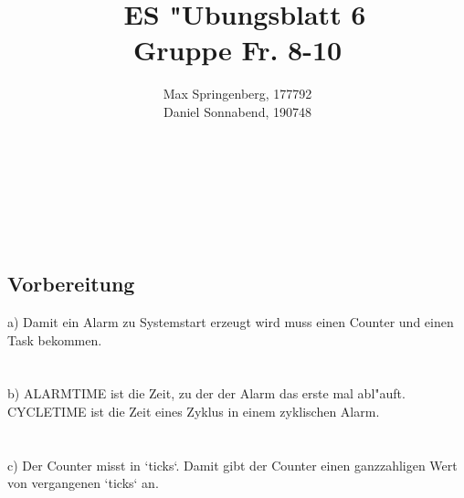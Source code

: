 \documentclass{article}
\author{Max Springenberg, 177792\\
        Daniel Sonnabend, 190748}
\title{\
    ES "Ubungsblatt 6\\
    Gruppe Fr. 8-10
    }
\date{}
\newcommand{\gap}{\ \\ \\}
\begin{document}
\maketitle
\\
\gap
\\
\subsection{Vorbereitung}
a) Damit ein Alarm zu Systemstart erzeugt wird muss einen Counter und einen Task
    bekommen.\\
\gap
b) ALARMTIME ist die Zeit, zu der der Alarm das erste mal abl"auft.
    CYCLETIME ist die Zeit eines  Zyklus in einem zyklischen Alarm.\\
\gap
c) Der Counter misst in `ticks`.
    Damit gibt der Counter einen ganzzahligen Wert von vergangenen `ticks` an.\\
\end{document}
